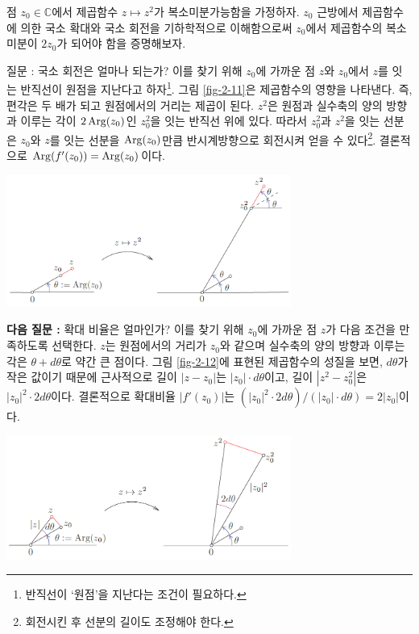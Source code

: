 \begin{saltexample}[label=example-2-12]{}{}
점 $z_0\in\mathbb C$에서 제곱함수  $z\mapsto z^2$가
복소미분가능함을 가정하자.
$z_0$ 근방에서 제곱함수에 의한  국소 확대와 국소 회전을 기하학적으로 이해함으로써
$z_0$에서 제곱함수의 복소미분이 $2z_0$가 되어야 함을 증명해보자.

{ 질문 :} 국소 회전은 얼마나 되는가?
이를 찾기 위해 $z_0$에 가까운 점 $z$와 $z_0$에서 $z$를 잇는 
반직선이 원점을 지난다고 하자\footnote{
반직선이 `원점'을 지난다는 조건이 필요하다.}.
그림 \ref{fig-2-11}은 제곱함수의 영향을 나타낸다. 즉, 편각은 두 배가 되고
원점에서의 거리는 제곱이 된다. 
 $z^2$은 원점과 
실수축의 양의 방향과 이루는 각이 $2\mathop{\mathrm{Arg}}(z_0)$인
$z_0^2$을 잇는 반직선 위에 있다.
따라서 $z_0^2$과 $z^2$을 잇는 선분은 
$z_0$와  $z$를 잇는 선분을 $\mathop{\mathrm{Arg}}(z_0)$만큼 반시계방향으로
회전시켜 얻을 수 있다\footnote{
회전시킨 후 선분의 길이도 조정해야 한다.}.
결론적으로  $\mathop{\mathrm{Arg}}(f'(z_0)) = \mathop{\mathrm{Arg}}(z_0)$이다.

\begin{center}
\includegraphics[width=0.7\textwidth]{./SaltChapter/figs/fig-2-11}
\end{center}
\label{fig-2-11}
\saltfigskip

{\bf 다음 질문 :} 확대 비율은 얼마인가?
이를 찾기 위해 $z_0$에 가까운 점 $z$가 다음 조건을 만족하도록 선택한다.
$z$는 원점에서의 거리가 $z_0$와 같으며 
실수축의 양의 방향과 이루는 각은 $\theta + d\theta$로 약간 큰 점이다.
그림 \ref{fig-2-12}에 표현된 제곱함수의 성질을 보면,
$d\theta$가 작은 값이기 때문에 근사적으로 길이 $|z-z_0|$는  $|z_0|\cdot d\theta$이고,
길이 $|z^2-z_0^2|$은 $|z_0|^2\cdot 2d\theta$이다.
결론적으로 확대비율 $|f'(z_0)|$는 $(|z_0|^2\cdot 2d\theta)/(|z_0|\cdot d\theta) = 2|z_0|$이다.


\begin{center}
\includegraphics[width=0.7\textwidth]{./SaltChapter/figs/fig-2-12}
\end{center}
\label{fig-2-12}
\saltfigskip


\end{saltexample}

